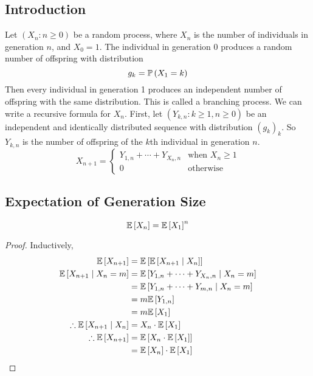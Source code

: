 \subsection{Introduction}
Let \((X_n \colon n \geq 0)\) be a random process, where \(X_n\) is the number of individuals in generation \(n\), and \(X_0 = 1\).
The individual in generation 0 produces a random number of offspring with distribution
\[
	g_k = \mathbb{P}\left({X_1 = k}\right)
\]
Then every individual in generation 1 produces an independent number of offspring with the same distribution.
This is called a branching process.
We can write a recursive formula for \(X_n\).
First, let \((Y_{k, n} \colon k \geq 1, n \geq 0)\) be an independent and identically distributed sequence with distribution \((g_k)_k\).
So \(Y_{k, n}\) is the number of offspring of the \(k\)th individual in generation \(n\).
\[
	X_{n+1} = \begin{cases}
		Y_{1,n} + \cdots + Y_{X_n,n} & \text{when } X_n \geq 1 \\
		0                            & \text{otherwise}
	\end{cases}
\]

\subsection{Expectation of Generation Size}
\begin{theorem}
	\[
		\mathbb{E}\left[{X_n}\right] = \mathbb{E}\left[{X_1}\right]^n
	\]
\end{theorem}
\begin{proof}
	Inductively,
	\begin{align*}
		\mathbb{E}\left[{X_{n+1}}\right]                     & = \mathbb{E}\left[{\mathbb{E}\left[{X_{n+1} \mid X_n}\right]}\right]                 \\
		\mathbb{E}\left[{X_{n+1} \mid X_n = m}\right]        & = \mathbb{E}\left[{Y_{1,n} + \cdots + Y_{X_n,n} \mid X_n = m}\right] \\
		                                     & = \mathbb{E}\left[{Y_{1,n} + \cdots + Y_{m,n} \mid X_n = m}\right]   \\
		                                     & = m \mathbb{E}\left[{Y_{1,n}}\right]                                 \\
		                                     & = m \mathbb{E}\left[{X_1}\right]                                     \\
		\therefore \mathbb{E}\left[{X_{n+1} \mid X_n}\right] & = X_n \cdot \mathbb{E}\left[{X_1}\right]                             \\
		\therefore \mathbb{E}\left[{X_{n+1}}\right]          & = \mathbb{E}\left[{X_n \cdot \mathbb{E}\left[{X_1}\right]}\right]                    \\
		                                     & = \mathbb{E}\left[{X_n}\right] \cdot \mathbb{E}\left[{X_1}\right]
	\end{align*}
\end{proof}


